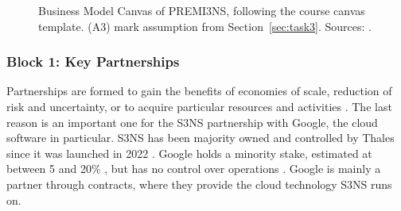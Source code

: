 \begin{figure}[htbp]
\caption{Business Model Canvas of PREMI3NS, following the course canvas template. (A3) mark assumption from Section~\ref{sec:task3}. Sources: \cite{s3ns2025premi3ns, s3nsecosystem, thalessap2026, paperjam2026, pappers2026}.}
\label{fig:bmc}
\end{figure}

\subsubsection{Block 1: Key Partnerships}
Partnerships are formed to gain the benefits of economies of scale, reduction of risk and uncertainty, or to acquire particular resources and activities \parencite[pp.~38--39]{osterwalder2010}. The last reason is an important one for the S3NS partnership with Google, the cloud software in particular. S3NS has been majority owned and controlled by Thales since it was launched in 2022 \parencite{thales2022, s3ns2025premi3ns}. Google holds a minority stake, estimated at between 5 and 20\% \parencite{alenatec2026, futurum2026}, but has no control over operations \parencite{s3ns2025premi3ns}. Google is mainly a partner through contracts, where they provide the cloud technology S3NS runs on. 

